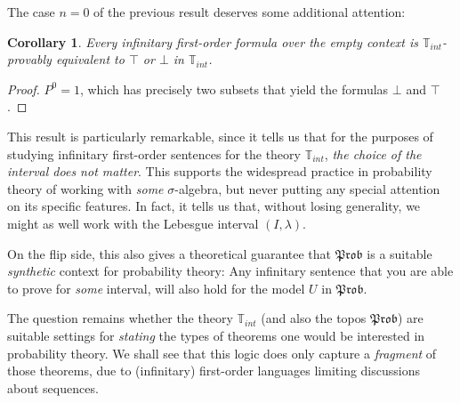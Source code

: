 \documentclass[a4paper]{amsproc}
\theoremstyle{plain}
\newtheorem{corollary}[theorem]{Corollary}
\theoremstyle{definition}
\theoremstyle{remark}
\numberwithin{equation}{section}
\newcommand{\Prob}{\mathfrak{Prob}}
\begin{document}
The case $n = 0$ of the previous result deserves some additional attention:

\begin{corollary}
    Every infinitary first-order formula over the empty context is $\mathbb{T}_{int}$-provably equivalent to $\top$ or $\bot$ in $\mathbb{T}_{int}$.
\end{corollary}

\begin{proof}
    $P^0 = 1$, which has precisely two subsets that yield the formulas $\bot$ and $\top$.
\end{proof}

This result is particularly remarkable, since it tells us that for the purposes of studying infinitary first-order sentences for the theory $\mathbb{T}_{int}$, \emph{the choice of the interval does not matter}. This supports the widespread practice in probability theory of working with \emph{some} $\sigma$-algebra, but never putting any special attention on its specific features. In fact, it tells us that, without losing generality, we might as well work with the Lebesgue interval $(I,\lambda)$.

On the flip side, this also gives a theoretical guarantee that $\Prob$ is a suitable \emph{synthetic} context for probability theory: Any infinitary sentence that you are able to prove for \emph{some} interval, will also hold for the model $U$ in $\Prob$.

The question remains whether the theory $\mathbb{T}_{int}$ (and also the topos $\Prob$) are suitable settings for \emph{stating} the types of theorems one would be interested in probability theory. We shall see that this logic does only capture a \emph{fragment} of those theorems, due to (infinitary) first-order languages limiting discussions about sequences.



\end{document}
